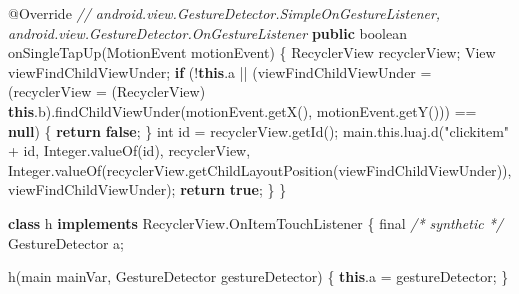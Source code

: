 \documentclass[
]{article}
\newenvironment{Shaded}{}{}
\newcommand{\AttributeTok}[1]{\textcolor[rgb]{0.49,0.56,0.16}{#1}}
\newcommand{\BuiltInTok}[1]{\textcolor[rgb]{0.00,0.50,0.00}{#1}}
\newcommand{\CommentTok}[1]{\textcolor[rgb]{0.38,0.63,0.69}{\textit{#1}}}
\newcommand{\ControlFlowTok}[1]{\textcolor[rgb]{0.00,0.44,0.13}{\textbf{#1}}}
\newcommand{\DataTypeTok}[1]{\textcolor[rgb]{0.56,0.13,0.00}{#1}}
\newcommand{\FunctionTok}[1]{\textcolor[rgb]{0.02,0.16,0.49}{#1}}
\newcommand{\KeywordTok}[1]{\textcolor[rgb]{0.00,0.44,0.13}{\textbf{#1}}}
\newcommand{\NormalTok}[1]{#1}
\newcommand{\OperatorTok}[1]{\textcolor[rgb]{0.40,0.40,0.40}{#1}}
\newcommand{\StringTok}[1]{\textcolor[rgb]{0.25,0.44,0.63}{#1}}
\begin{document}
\begin{Shaded}
\begin{Highlighting}[]
        \AttributeTok{@Override} \CommentTok{// android.view.GestureDetector.SimpleOnGestureListener, android.view.GestureDetector.OnGestureListener}
        \KeywordTok{public} \DataTypeTok{boolean} \FunctionTok{onSingleTapUp}\OperatorTok{(}\NormalTok{MotionEvent motionEvent}\OperatorTok{)} \OperatorTok{\{}
\NormalTok{            RecyclerView recyclerView}\OperatorTok{;}
            \BuiltInTok{View}\NormalTok{ viewFindChildViewUnder}\OperatorTok{;}
            \ControlFlowTok{if} \OperatorTok{(!}\KeywordTok{this}\OperatorTok{.}\FunctionTok{a} \OperatorTok{||} \OperatorTok{(}\NormalTok{viewFindChildViewUnder }\OperatorTok{=} \OperatorTok{(}\NormalTok{recyclerView }\OperatorTok{=} \OperatorTok{(}\NormalTok{RecyclerView}\OperatorTok{)} \KeywordTok{this}\OperatorTok{.}\FunctionTok{b}\OperatorTok{).}\FunctionTok{findChildViewUnder}\OperatorTok{(}\NormalTok{motionEvent}\OperatorTok{.}\FunctionTok{getX}\OperatorTok{(),}\NormalTok{ motionEvent}\OperatorTok{.}\FunctionTok{getY}\OperatorTok{()))} \OperatorTok{==} \KeywordTok{null}\OperatorTok{)} \OperatorTok{\{}
                \ControlFlowTok{return} \KeywordTok{false}\OperatorTok{;}
            \OperatorTok{\}}
            \DataTypeTok{int}\NormalTok{ id }\OperatorTok{=}\NormalTok{ recyclerView}\OperatorTok{.}\FunctionTok{getId}\OperatorTok{();}
\NormalTok{            main}\OperatorTok{.}\FunctionTok{this}\OperatorTok{.}\FunctionTok{luaj}\OperatorTok{.}\FunctionTok{d}\OperatorTok{(}\StringTok{"clickitem"} \OperatorTok{+}\NormalTok{ id}\OperatorTok{,} \BuiltInTok{Integer}\OperatorTok{.}\FunctionTok{valueOf}\OperatorTok{(}\NormalTok{id}\OperatorTok{),}\NormalTok{ recyclerView}\OperatorTok{,} \BuiltInTok{Integer}\OperatorTok{.}\FunctionTok{valueOf}\OperatorTok{(}\NormalTok{recyclerView}\OperatorTok{.}\FunctionTok{getChildLayoutPosition}\OperatorTok{(}\NormalTok{viewFindChildViewUnder}\OperatorTok{)),}\NormalTok{ viewFindChildViewUnder}\OperatorTok{);}
            \ControlFlowTok{return} \KeywordTok{true}\OperatorTok{;}
        \OperatorTok{\}}
    \OperatorTok{\}}

    \KeywordTok{class}\NormalTok{ h }\KeywordTok{implements}\NormalTok{ RecyclerView}\OperatorTok{.}\FunctionTok{OnItemTouchListener} \OperatorTok{\{}
        \DataTypeTok{final} \CommentTok{/* synthetic */}\NormalTok{ GestureDetector a}\OperatorTok{;}

        \FunctionTok{h}\OperatorTok{(}\NormalTok{main mainVar}\OperatorTok{,}\NormalTok{ GestureDetector gestureDetector}\OperatorTok{)} \OperatorTok{\{}
            \KeywordTok{this}\OperatorTok{.}\FunctionTok{a} \OperatorTok{=}\NormalTok{ gestureDetector}\OperatorTok{;}
        \OperatorTok{\}}


\end{Highlighting}
\end{Shaded}
\end{document}

